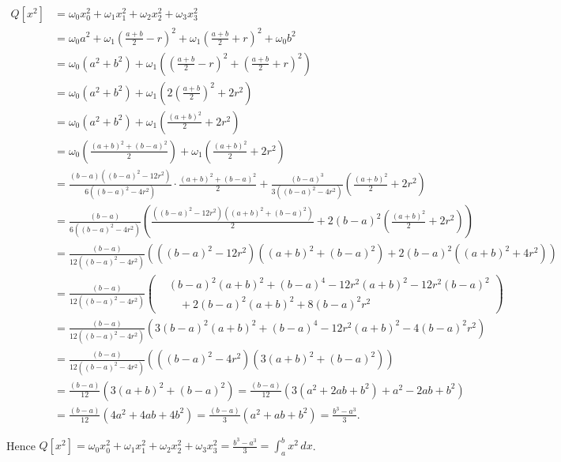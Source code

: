 \documentclass[]{article}
\begin{document}
\begin{enumerate}
\begin{itemize}
\begin{align*}
Q[x^2] 
&=\omega_0 x_0^2 +\omega_1x_1^2+\omega_2x_2^2+\omega_3 x_3^2\\
&=\omega_0 a^2+\omega_1\left(\frac{a+b}{2}-r\right)^2+\omega_1\left(\frac{a+b}{2}+r\right)^2+\omega_0 b^2\\
&=\omega_0(a^2+b^2)+\omega_1\left(\left(\frac{a+b}{2}-r\right)^2+\left(\frac{a+b}{2}+r\right)^2\right)\\
&=\omega_0(a^2+b^2)+\omega_1\left(2\left(\frac{a+b}{2}\right)^2+2r^2\right)\\
&=\omega_0(a^2+b^2)+\omega_1\left(\frac{(a+b)^2}{2}+2r^2\right)\\
&=\omega_0\left(\frac{(a+b)^2+(b-a)^2}{2}\right)+\omega_1\left(\frac{(a+b)^2}{2}+2r^2\right)\\
&=\frac{(b-a)\left((b-a)^2-12r^2\right)}{6\left((b-a)^2-4r^2\right)}\cdot\frac{(a+b)^2+(b-a)^2}{2} +\frac{(b-a)^3}{3\left((b-a)^2-4r^2\right)}\left(\frac{(a+b)^2}{2}+2r^2\right)\\
&=\frac{(b-a)}{6\left((b-a)^2-4r^2\right)}
\left(
\frac{\left((b-a)^2-12r^2\right)\left((a+b)^2+(b-a)^2\right)}{2}
+2(b-a)^2\left(\frac{(a+b)^2}{2}+2r^2\right)
\right)\\
&=\frac{(b-a)}{12\left((b-a)^2-4r^2\right)}
\left(
\left((b-a)^2-12r^2\right)\left((a+b)^2+(b-a)^2\right)
+2(b-a)^2\left((a+b)^2+4r^2\right)
\right)\\
&=\frac{(b-a)}{12\left((b-a)^2-4r^2\right)}
\left(
\begin{aligned}
&(b-a)^2(a+b)^2+(b-a)^4-12r^2(a+b)^2-12r^2(b-a)^2\\
&\quad+2(b-a)^2(a+b)^2+8(b-a)^2 r^2
\end{aligned}
\right)\\
&=\frac{(b-a)}{12\left((b-a)^2-4r^2\right)}
\left(
3(b-a)^2(a+b)^2+(b-a)^4-12r^2(a+b)^2-4(b-a)^2 r^2
\right)\\
&=\frac{(b-a)}{12\left((b-a)^2-4r^2\right)}
\left(
\left((b-a)^2-4r^2\right)\left(3(a+b)^2+(b-a)^2\right)
\right)\\
&=\frac{(b-a)}{12}\left(3(a+b)^2+(b-a)^2\right)
=\frac{(b-a)}{12}\left(3(a^2+2ab+b^2)+a^2-2ab+b^2\right)\\
&=\frac{(b-a)}{12}\left(4a^2+4ab+4b^2\right)
=\frac{(b-a)}{3}\left(a^2+ab+b^2\right)
=\frac{b^3-a^3}{3}.
\end{align*}


Hence \(Q[x^2]=\omega_0 x_0^2 +\omega_1x_1^2+\omega_2x_2^2+\omega_3 x_3^2=\frac{b^3-a^3}{3}=\int_a^b x^2\,dx\).\newline


\end{itemize}
\end{enumerate}
\end{document}
